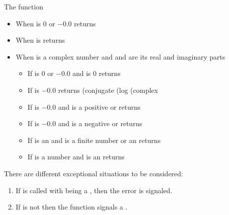 \documentclass[../Comparisons-Predicates.tex]{subfiles}
\begin{document}
    \noindent
    The function 
    \begin{itemize}
        \item When  is $0$ or $-0.0$ returns
        \item When  is  returns
        \item When  is a complex number and  and
         are its real and imaginary parts
        \begin{itemize}
            \item If  is $0$ or $-0.0$ and
             is $0$ returns  \code{)))}
            \item If  is $-0.0$ returns \code
            {(conjugate (log (complex } 
            \item If  is $-0.0$ and  is a
            positive  or  returns
             
            \item If  is $-0.0$ and  is a
            negative  or  returns
             
            \item If  is an  and 
            is a finite number or an  returns
            \code{)))}
            \item If  is a  number and 
            is an  returns
             \code{)))}
        \end{itemize}
    \end{itemize}


    \DExceptional{}

    There are different exceptional situations to be considered:
    \begin{enumerate}
        \item If  is called with
         being a , then the
         error is signaled.
        \item If  is not \CL{}
         then the function  signals a
        .
    \end{enumerate}
\end{document}
